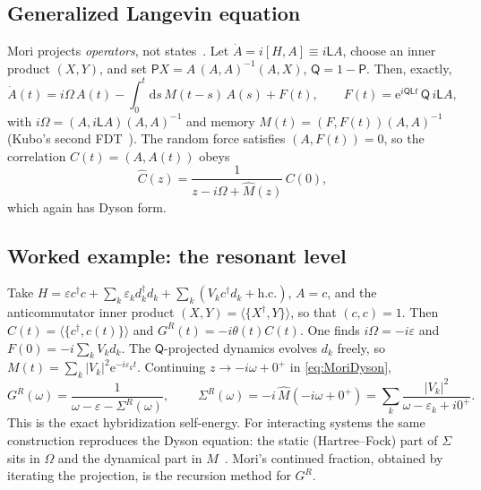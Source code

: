 \documentclass[11pt]{article}
\newcommand{\ee}{\mathrm{e}}
\newcommand{\dd}{\mathrm{d}}
\newcommand{\avg}[1]{\langle#1\rangle}
\begin{document}
\subsection{Generalized Langevin equation}
Mori projects \emph{operators}, not states~\cite{Mori1965,ZwanzigBook,Forster1975}. Let
$\dot A=i[H,A]\equiv i\mathsf{L}A$, choose an inner product $(X,Y)$, and set
$\mathsf{P}X=A\,(A,A)^{-1}(A,X)$, $\mathsf{Q}=1-\mathsf{P}$. Then, exactly,
\begin{equation}
  \dot A(t)=i\Omega\,A(t)-\int_0^t\!\dd s\,M(t-s)\,A(s)+F(t),\qquad
  F(t)=\ee^{i\mathsf{QL}t}\,\mathsf{Q}\,i\mathsf{L}A,
  \label{eq:GLE}
\end{equation}
with $i\Omega=(A,i\mathsf{L}A)(A,A)^{-1}$ and memory $M(t)=(F,F(t))(A,A)^{-1}$
(Kubo's second FDT~\cite{Kubo1966}). The random force satisfies $(A,F(t))=0$, so the correlation
$C(t)=(A,A(t))$ obeys
\begin{equation}
  \hat C(z)=\frac{1}{z-i\Omega+\hat M(z)}\,C(0),
  \label{eq:MoriDyson}
\end{equation}
which again has Dyson form.

\subsection{Worked example: the resonant level}
Take $H=\varepsilon c^\dagger c+\sum_k\varepsilon_kd_k^\dagger d_k+\sum_k(V_kc^\dagger d_k+\text{h.c.})$,
$A=c$, and the anticommutator inner product $(X,Y)=\avg{\{X^\dagger,Y\}}$, so that $(c,c)=1$. Then
$C(t)=\avg{\{c^\dagger,c(t)\}}$ and $G^R(t)=-i\theta(t)C(t)$. One finds $i\Omega=-i\varepsilon$ and
$F(0)=-i\sum_kV_kd_k$. The $\mathsf{Q}$-projected dynamics evolves $d_k$ freely, so
$M(t)=\sum_k|V_k|^2\ee^{-i\varepsilon_kt}$. Continuing $z\to-i\omega+0^+$ in \cref{eq:MoriDyson},
\begin{equation}
  G^R(\omega)=\frac{1}{\omega-\varepsilon-\Sigma^R(\omega)},\qquad
  \boxed{\;\Sigma^R(\omega)=-i\,\hat M(-i\omega+0^+)=\sum_k\frac{|V_k|^2}{\omega-\varepsilon_k+i0^+}.\;}
\end{equation}
This is the exact hybridization self-energy. For interacting systems the same
construction reproduces the Dyson equation: the static (Hartree--Fock) part of $\Sigma$
sits in $\Omega$ and the dynamical part in $M$~\cite{Fulde1995}. Mori's continued fraction,
obtained by iterating the projection, is the recursion method for $G^R$.
\end{document}

